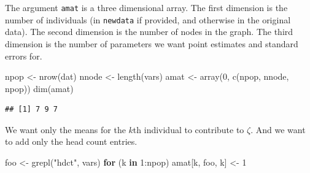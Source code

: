 \documentclass[
  ignorenonframetext,
]{beamer}
\newenvironment{Shaded}{\begin{snugshade}}{\end{snugshade}}
\newcommand{\ControlFlowTok}[1]{\textcolor[rgb]{0.13,0.29,0.53}{\textbf{#1}}}
\newcommand{\DecValTok}[1]{\textcolor[rgb]{0.00,0.00,0.81}{#1}}
\newcommand{\FunctionTok}[1]{\textcolor[rgb]{0.00,0.00,0.00}{#1}}
\newcommand{\NormalTok}[1]{#1}
\newcommand{\OtherTok}[1]{\textcolor[rgb]{0.56,0.35,0.01}{#1}}
\newcommand{\SpecialCharTok}[1]{\textcolor[rgb]{0.00,0.00,0.00}{#1}}
\newcommand{\StringTok}[1]{\textcolor[rgb]{0.31,0.60,0.02}{#1}}
\begin{document}
\begin{frame}[fragile]{}
\protect\hypertarget{section-37}{}
The argument \texttt{amat} is a three dimensional array. The first
dimension is the number of individuals (in \texttt{newdata} if provided,
and otherwise in the original data). The second dimension is the number
of nodes in the graph. The third dimension is the number of parameters
we want point estimates and standard errors for.

\vspace{12pt}
\tiny

\begin{Shaded}
\begin{Highlighting}[]
\NormalTok{npop }\OtherTok{\textless{}{-}} \FunctionTok{nrow}\NormalTok{(dat) }
\NormalTok{nnode }\OtherTok{\textless{}{-}} \FunctionTok{length}\NormalTok{(vars)}
\NormalTok{amat }\OtherTok{\textless{}{-}} \FunctionTok{array}\NormalTok{(}\DecValTok{0}\NormalTok{, }\FunctionTok{c}\NormalTok{(npop, nnode, npop))}
\FunctionTok{dim}\NormalTok{(amat)}
\end{Highlighting}
\end{Shaded}

\begin{verbatim}
## [1] 7 9 7
\end{verbatim}
\end{frame}

\begin{frame}[fragile]{}
\protect\hypertarget{section-38}{}
We want only the means for the \(k\)th individual to contribute to
\(\zeta\). And we want to add only the head count entries.

\vspace{12pt}
\tiny

\begin{Shaded}
\begin{Highlighting}[]
\NormalTok{foo }\OtherTok{\textless{}{-}} \FunctionTok{grepl}\NormalTok{(}\StringTok{"hdct"}\NormalTok{, vars)}
\ControlFlowTok{for}\NormalTok{ (k }\ControlFlowTok{in} \DecValTok{1}\SpecialCharTok{:}\NormalTok{npop) amat[k, foo, k] }\OtherTok{\textless{}{-}} \DecValTok{1}
\end{Highlighting}
\end{Shaded}
\end{frame}
\end{document}

